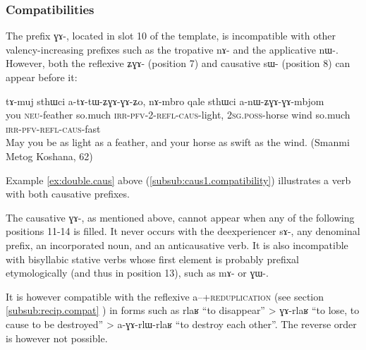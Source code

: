 \documentclass[oldfontcommands,oneside,a4paper,11pt]{memoir}
\newcommand{\ipa}[1]{{\phon #1}} %
\newcommand{\caus}{\textsc{caus}}
\newcommand{\irr}{\textsc{irr}}
\newcommand{\neu}{\textsc{neu}}
\newcommand{\pfv}{\textsc{pfv}}
\newcommand{\poss}{\textsc{poss}}
\newcommand{\refl}{\textsc{refl}}
\newcommand{\sg}{\textsc{sg}}
\begin{document}
 
\subsubsection{Compatibilities} \label{subsub:caus2:compat}
The prefix \ipa{ɣɤ-}, located in slot 10 of the template, is incompatible with other valency-increasing prefixes such as the tropative  \ipa{nɤ-} and the applicative  \ipa{nɯ-}. However, both the reflexive  \ipa{ʑɣɤ-} (position 7) and causative  \ipa{sɯ-} (position 8) can appear before it:
 \begin{exe}
\ex 
\gll \ipa{nɤʑo}  	\ipa{tɤ-muj}  	\ipa{sthɯci}  	\ipa{a-tɤ-tɯ-ʑɣɤ-ɣɤ-ʑo,}  	\ipa{nɤ-mbro}  	\ipa{qale}  	\ipa{sthɯci}  	\ipa{a-nɯ-ʑɣɤ-ɣɤ-mbjom}  	  \\
you \neu{}-feather  so.much \irr{}-\pfv{}-2-\refl-\caus{}-light, 2\sg{}.\poss{}-horse wind so.much \irr{}-\pfv{}-\refl-\caus{}-fast \\
 \glt   May you be as light as a feather, and your horse as swift as the wind. (Smanmi Metog Koshana, 62)
   \end{exe}
Example  \ref{ex:double.caus} above (\ref{subsub:caus1.compatibility}) illustrates a verb with both causative prefixes.

The causative \ipa{ɣɤ-}, as mentioned above, cannot appear when any of the following positions 11-14 is filled. It never occurs with the deexperiencer \ipa{sɤ-}, any denominal prefix, an incorporated noun, and an anticausative verb. It is also incompatible with bisyllabic stative verbs whose first element is probably prefixal etymologically (and thus in position 13), such as \ipa{mɤ-} or \ipa{ɣɯ-}. 


It is however compatible with the reflexive \ipa{a}--+\textsc{reduplication} (see section \ref{subsub:recip.compat} ) in forms such as \ipa{rlaʁ}    ``to disappear'' > \ipa{ɣɤ-rlaʁ} ``to lose, to cause to be destroyed'' > \ipa{a-ɣɤ-rlɯ-rlaʁ} ``to destroy each other''. The reverse order is however not possible.
 
\end{document}
